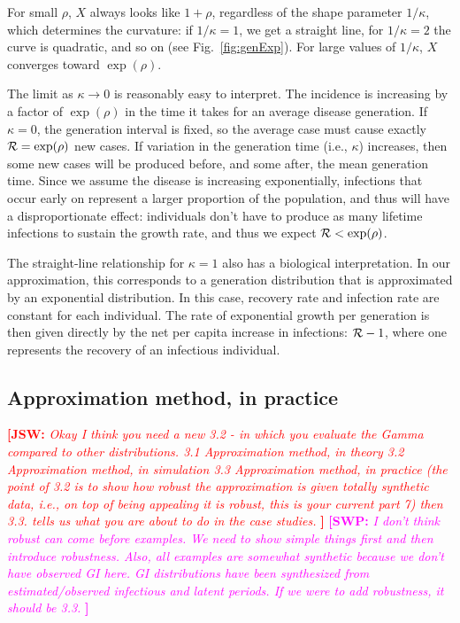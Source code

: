 \documentclass[12pt]{article}
\newcommand{\RR}{\ensuremath{{\cal R}}}
\newcommand{\fref}[1]{Fig.~\ref{fig:#1}}
\newcommand{\comment}[3]{\textcolor{#1}{\textbf{[#2: }\textit{#3}\textbf{]}}}
\newcommand{\swp}[1]{\comment{magenta}{SWP}{#1}}
\newcommand{\jsw}[1]{\comment{red}{JSW}{#1}}
\begin{document}
For small $\rho$, $X$ always looks like $1+\rho$, regardless of the shape parameter $1/\kappa$, which determines the curvature: if $1/\kappa = 1$, we get a straight line, for $1/\kappa=2$ the curve is quadratic, and so on (see \fref{genExp}).
For large values of $1/\kappa$, $X$ converges toward $\exp(\rho)$.

The limit as $\kappa\to 0$ is reasonably easy to interpret. The incidence is increasing by a factor of $\exp(\rho)$ in the time it takes for an average disease generation. If $\kappa=0$, the generation interval is fixed, so the average case must cause exactly $\RR = \exp(\rho)$ new cases.
If variation in the generation time (i.e., $\kappa$) increases, then some new cases will be produced before, and some after, the mean generation time.
Since we assume the disease is increasing exponentially, infections that occur early on represent a larger proportion of the population, and thus will have a disproportionate effect: individuals don't have to produce as many lifetime infections to sustain the growth rate, and thus we expect  $\RR < \exp(\rho)$.

The straight-line relationship for $\kappa=1$ also has a biological interpretation. 
In our approximation, this corresponds to a generation distribution that is approximated by an exponential distribution. 
In this case, recovery rate and infection rate are constant for each individual.
The rate of exponential growth per generation is then given directly by the net per capita increase in infections: $\RR-1$, where one represents the recovery of an infectious individual. 

\subsection{Approximation method, in practice}

\jsw{
Okay I think you need a new 3.2 - in which you evaluate the Gamma compared to other distributions.
3.1 Approximation method, in theory
3.2 Approximation method, in simulation
3.3 Approximation method, in practice
(the point of 3.2 is to show how robust the approximation is given totally synthetic data, i.e., on top of being appealing it is robust, this is your current part 7)
then 3.3. tells us what you are about to do in the case studies.
}
\swp{
I don't think robust can come before examples. 
We need to show simple things first and then introduce robustness.
Also, all examples are somewhat synthetic because we don't have observed GI here. 
GI distributions have been synthesized from estimated/observed infectious and latent periods.
If we were to add robustness, it should be 3.3.
}
\end{document}
